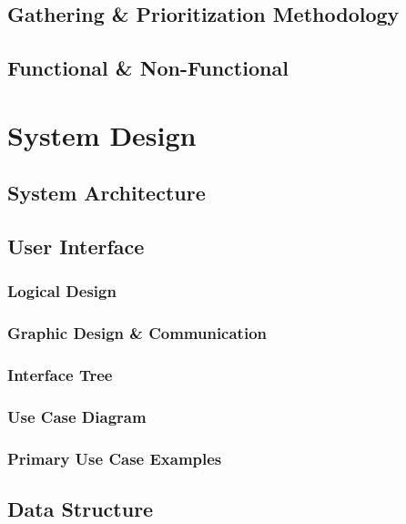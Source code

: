 \documentclass[11pt, english]{article}
\begin{document}
	\subsection{Gathering \& Prioritization Methodology}

	\subsection{Functional \& Non-Functional}

\newpage

\section{System Design}\label{ch5}

	\subsection{System Architecture}

	\subsection{User Interface}

		\subsubsection{Logical Design}

		\subsubsection{Graphic Design \& Communication}

		\subsubsection{Interface Tree}

		\subsubsection{Use Case Diagram}

		\subsubsection{Primary Use Case Examples}

	\subsection{Data Structure}
\end{document}
